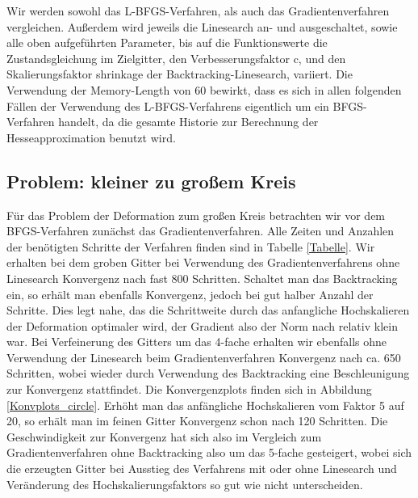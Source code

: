 Wir werden sowohl das L-BFGS-Verfahren, als auch das Gradientenverfahren vergleichen. Außerdem wird jeweils die Linesearch an- und ausgeschaltet, sowie alle oben aufgeführten Parameter, bis auf die Funktionswerte die Zustandsgleichung im Zielgitter, den Verbesserungsfaktor \textsf{c}, und den Skalierungsfaktor \textsf{shrinkage} der Backtracking-Linesearch, variiert. Die Verwendung der Memory-Length von 60 bewirkt, dass es sich in allen folgenden Fällen der Verwendung des L-BFGS-Verfahrens eigentlich um ein BFGS-Verfahren handelt, da die gesamte Historie zur Berechnung der Hesseapproximation benutzt wird. 

\subsection{Problem: kleiner zu großem Kreis}\label{subsect_circle}

Für das Problem der Deformation zum großen Kreis betrachten wir vor dem BFGS-Verfahren zunächst das Gradientenverfahren. Alle Zeiten und Anzahlen der benötigten Schritte der Verfahren finden sind in Tabelle \ref{Tabelle}. Wir erhalten bei dem groben Gitter 
bei Verwendung des Gradientenverfahrens ohne Linesearch Konvergenz nach fast 800 Schritten. Schaltet man das Backtracking ein, so erhält man ebenfalls Konvergenz, jedoch bei gut halber Anzahl der Schritte. Dies legt nahe, das die Schrittweite durch das anfangliche Hochskalieren der Deformation optimaler wird, der Gradient also der Norm nach relativ klein war. Bei Verfeinerung des Gitters um das 4-fache erhalten wir ebenfalls ohne Verwendung der Linesearch beim Gradientenverfahren Konvergenz nach ca. 650 Schritten, wobei wieder durch Verwendung des Backtracking eine Beschleunigung zur Konvergenz stattfindet. Die Konvergenzplots finden sich in Abbildung \ref{Konvplots_circle}. Erhöht man das anfängliche Hochskalieren vom Faktor 5 auf 20, so erhält man im feinen Gitter Konvergenz schon nach 120 Schritten. Die Geschwindigkeit zur Konvergenz hat sich also im Vergleich zum Gradientenverfahren ohne Backtracking also um das 5-fache gesteigert, wobei sich die erzeugten Gitter bei Ausstieg des Verfahrens mit oder ohne Linesearch und Veränderung des Hochskalierungsfaktors so gut wie nicht unterscheiden. 

